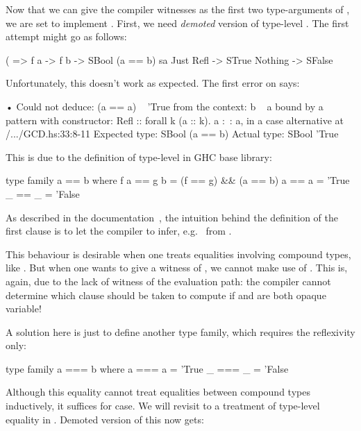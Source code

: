 \documentclass[demotion-paper.tex]{subfiles}
\begin{document}
Now that we can give the compiler witnesses as the first two type-arguments of , we are set to implement .
First, we need \emph{demoted} version of type-level \hask{(==)}.
The first attempt might go as follows:
\begin{code}
(%
      => f a -> f b -> SBool (a == b)
sa %
  Just Refl -> STrue
  Nothing -> SFalse
\end{code}
Unfortunately, this doesn't work as expected.
The first error on  says:

\begin{repl}
• Could not deduce: (a == a) ~ 'True
  from the context: b ~ a
    bound by a pattern with constructor:
               Refl :: forall k (a :: k). a :~: a,
             in a case alternative
    at /.../GCD.hs:33:8-11
  Expected type: SBool (a == b)
    Actual type: SBool 'True
\end{repl}

This is due to the definition of type-level \hask{(==)} in GHC base library:

\begin{code}
type family a == b where
  f a == g b = (f == g) && (a == b)
  a   == a   = 'True
  _   == _   = 'False
\end{code}
As described in the documentation~\cite{GHC-Team:2021aa}, the intuition behind the definition of the first clause is to let the compiler to infer, e.g.\  from .

This behaviour is desirable when one treats equalities involving compound types, like .
But when one wants to give a witness of , we cannot make use of .
This is, again, due to the lack of witness of the evaluation path: the compiler cannot determine which clause should be taken to compute  if  and  are both opaque variable!

A solution here is just to define another type family, which requires the reflexivity only:
\begin{code}
type family a === b where
  a === a = 'True
  _ === _ = 'False
\end{code}

Although this equality cannot treat equalities between compound types inductively, it suffices for  case.
We will revisit to a treatment of type-level equality in .
Demoted version of this now gets:
\end{document}
